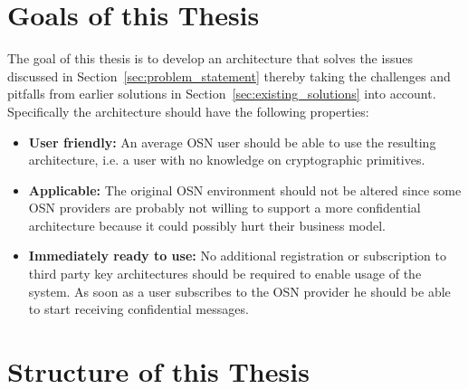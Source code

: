 \section{Goals of this Thesis}
\label{sec:goals_of_this_thesis}
The goal of this thesis is to develop an architecture that solves the issues discussed in Section~\ref{sec:problem_statement} thereby taking the challenges and pitfalls from earlier solutions in Section~\ref{sec:existing_solutions} into account. Specifically the architecture should have the following properties:
\begin{itemize}
 \item \textbf{User friendly:} An average OSN user should be able to use the resulting architecture, i.e. a user with no knowledge on cryptographic primitives.
 \item \textbf{Applicable:} The original OSN environment should not be altered since some OSN providers are probably not willing to support a more confidential architecture because it could possibly hurt their business model.
 \item \textbf{Immediately ready to use:} No additional registration or subscription to third party key architectures should be required to enable usage of the system. As soon as a user subscribes to the OSN provider he should be able to start receiving confidential messages.
\end{itemize}


\section{Structure of this Thesis}

